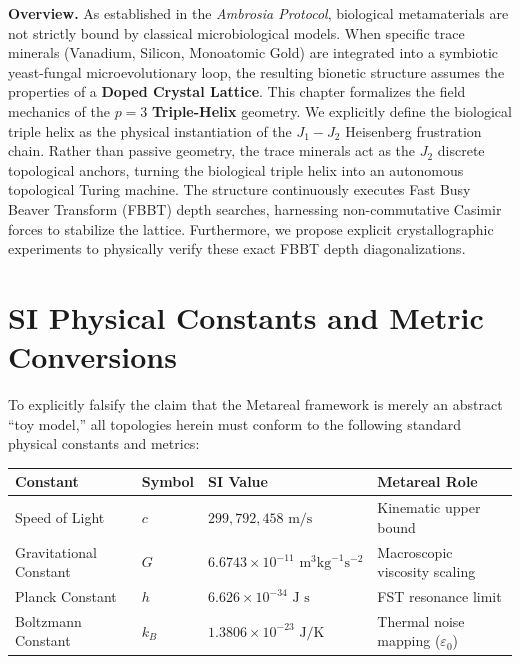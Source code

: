 \vspace{1em}\noindent\textbf{Overview.}
As established in the \textit{Ambrosia Protocol}, biological metamaterials are not strictly bound by classical microbiological models. When specific trace minerals (Vanadium, Silicon, Monoatomic Gold) are integrated into a symbiotic yeast-fungal microevolutionary loop, the resulting bionetic structure assumes the properties of a \textbf{Doped Crystal Lattice}. This chapter formalizes the field mechanics of the $p=3$ \textbf{Triple-Helix} geometry. We explicitly define the biological triple helix as the physical instantiation of the $J_1-J_2$ Heisenberg frustration chain. Rather than passive geometry, the trace minerals act as the $J_2$ discrete topological anchors, turning the biological triple helix into an autonomous topological Turing machine. The structure continuously executes Fast Busy Beaver Transform (FBBT) depth searches, harnessing non-commutative Casimir forces to stabilize the lattice. Furthermore, we propose explicit crystallographic experiments to physically verify these exact FBBT depth diagonalizations.
\vspace{1em}

\section*{SI Physical Constants and Metric Conversions}
To explicitly falsify the claim that the Metareal framework is merely an abstract ``toy model,'' all topologies herein must conform to the following standard physical constants and metrics:
\begin{table}[ht]
\centering
\renewcommand{\arraystretch}{1.2}
\begin{tabular}{@{}llll@{}}
\toprule
\textbf{Constant} & \textbf{Symbol} & \textbf{SI Value} & \textbf{Metareal Role} \\
\midrule
Speed of Light & $c$ & $299,792,458 \text{ m/s}$ & Kinematic upper bound \\
Gravitational Constant & $G$ & $6.6743 \times 10^{-11} \text{ m}^3 \text{kg}^{-1} \text{s}^{-2}$ & Macroscopic viscosity scaling \\
Planck Constant & $h$ & $6.626 \times 10^{-34} \text{ J s}$ & FST resonance limit \\
Boltzmann Constant & $k_B$ & $1.3806 \times 10^{-23} \text{ J/K}$ & Thermal noise mapping ($\varepsilon_0$) \\
\bottomrule
\end{tabular}
\end{table}


